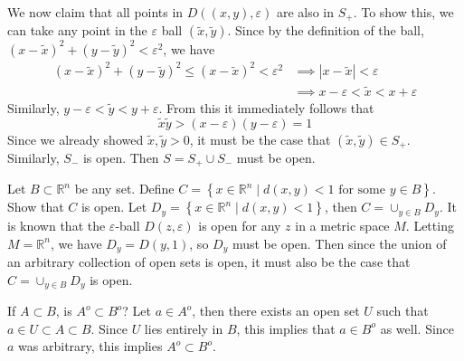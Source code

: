 \documentclass[10pt]{amsart}
\theoremstyle{plain}
\newenvironment{exercise}[1]{%
  \renewcommand\themanualtheoreminner{#1}%
  \manualtheoreminner
}{\endmanualtheoreminner}
\theoremstyle{definition}
\newcommand{\<}{\langle}
\renewcommand{\>}{\rangle}
\begin{document}
We now claim that all points in $D( (x,y), \varepsilon)$ are also in $S_+$. To show this, we can take any point in the $\varepsilon$ ball $(\tilde{x},\tilde{y})$. Since by the definition of the ball, $(x-\tilde{x})^2 + (y-\tilde{y})^2 < \varepsilon^2$, we have
\begin{align*}
	(x-\tilde{x})^2 + (y-\tilde{y})^2 \leq (x-\tilde{x})^2 < \varepsilon^2 &\implies |{x-\tilde{x}}| < \varepsilon \\
									       &\implies x-\varepsilon < \tilde{x} < x+\varepsilon
\end{align*}
Similarly, $y-\varepsilon < \tilde{y} < y+\varepsilon$. From this it immediately follows that
\[
	\tilde{x}\tilde{y} > (x-\varepsilon)(y-\varepsilon) = 1
\]
Since we already showed $\tilde{x},\tilde{y}>0$, it must be the case that $(\tilde{x},\tilde{y}) \in S_+$. Similarly, $S_-$ is open. Then $S = S_+ \cup S_-$ must be open.

\begin{exercise}{2.1.4}
	Let $B \subset \mathbb{R}^n$ be any set. Define $C=\left\{ x\in \mathbb{R}^n \;|\; d(x,y) < 1 \text{ for some } y \in B \right\}$. Show that $C$ is open.
\end{exercise}
Let $D_y = \left\{ x \in \mathbb{R}^n \;|\; d(x,y) < 1 \right\}$, then $C = \cup_{y \in B} D_y$. It is known that the $\varepsilon$-ball $D(z,\varepsilon)$ is open for any $z$ in a metric space $M$. Letting $M = \mathbb{R}^n$, we have $D_y = D(y,1)$, so $D_y$ must be open. Then since the union of an arbitrary collection of open sets is open, it must also be the case that $C = \cup_{y \in B} D_y$ is open.


\begin{exercise}{2.2.3}
	If $A \subset B$, is $A^o \subset B^o$?
\end{exercise}
Let $a \in A^o$, then there exists an open set $U$ such that $a \in U \subset A \subset B$. Since $U$ lies entirely in $B$, this implies that $a \in B^o$ as well. Since $a$ was arbitrary, this implies $A^o \subset B^o$.
\end{document}
